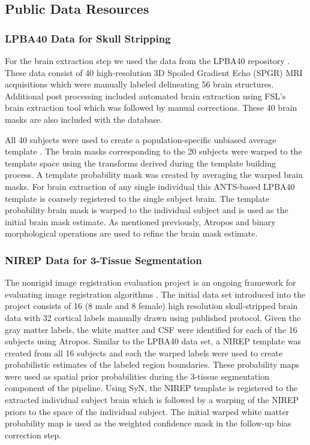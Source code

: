 \subsection{Public Data Resources}

\subsubsection{LPBA40 Data for Skull Stripping}

For the brain extraction step
we used the data from the LPBA40 repository \citep{shattuck2008}.
These data consist of 40 high-resolution 3D Spoiled Gradient Echo
(SPGR) MRI acquisitions which were manually labeled delineating
56 brain structures.  Additional post processing 
included automated brain extraction using FSL's brain extraction tool 
\citep{smith2002} which was followed by manual corrections.  These
40 brain masks are also included with the database.  

All 40 subjects were used to create a population-specific
unbiased average template \cite{avants2010}.  The brain masks corresponding 
to the 20 subjects were warped to the template space using the 
transforms derived during the template building process.  A template 
probability mask was created by averaging the warped brain masks.
For brain extraction of any single individual this ANTS-based LPBA40 template 
is coarsely registered to the single subject brain.  The template
probability brain mask is warped to the individual subject and 
is used as the initial brain mask estimate.  As mentioned previously,
Atropos and binary morphological operations are used to refine the
brain mask estimate.

\subsubsection{NIREP Data for 3-Tissue Segmentation}

The nonrigid image registration evaluation project is an ongoing 
framework for evaluating image registration algorithms \citep{christensen2006}.
The initial data set introduced into the project consists of 
16 (8 male and 8 female) high resolution skull-stripped brain 
data with 32 cortical labels manually drawn using published protocol.
Given the gray matter labels, the white matter and CSF were identified 
for each of the 16 subjects using Atropos.  Similar to the LPBA40
data set, a NIREP template was created from all 16 subjects and each the
warped labels were used to create probabilistic estimates of the 
labeled region boundaries. These probability maps were used as 
spatial prior probabilities during the 3-tissue segmentation component
of the pipeline.  Using SyN, the NIREP template is registered to the
extracted individual subject brain which is followed by a warping of the 
NIREP priors to the space of the individual subject.  The initial warped 
white matter probability map is used as the weighted confidence mask 
in the follow-up bias correction step.

